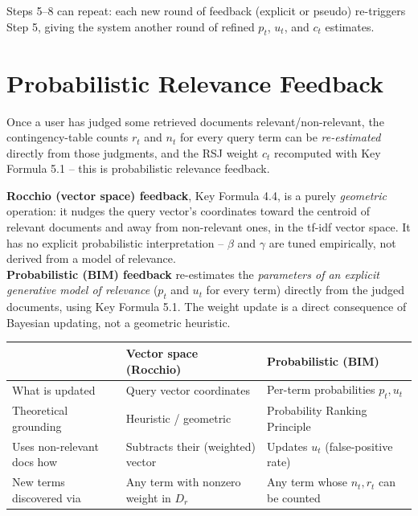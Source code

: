 \documentclass[11pt, a4paper]{article}
\begin{document}
Steps 5--8 can repeat: each new round of feedback (explicit or pseudo) re-triggers Step 5, giving the system another round of refined $p_t$, $u_t$, and $c_t$ estimates.

\section{Probabilistic Relevance Feedback}
\label{sec:vsm-vs-prob}

Once a user has judged some retrieved documents relevant/non-relevant, the contingency-table counts $r_t$ and $n_t$ for every query term can be \emph{re-estimated} directly from those judgments, and the RSJ weight $c_t$ recomputed with Key Formula 5.1 -- this is probabilistic relevance feedback.

\begin{defbox}
\textbf{Rocchio (vector space) feedback}, Key Formula 4.4, is a purely \emph{geometric} operation: it nudges the query vector's coordinates toward the centroid of relevant documents and away from non-relevant ones, in the tf-idf vector space. It has no explicit probabilistic interpretation -- $\beta$ and $\gamma$ are tuned empirically, not derived from a model of relevance.\\[4pt]
\textbf{Probabilistic (BIM) feedback} re-estimates the \emph{parameters of an explicit generative model of relevance} ($p_t$ and $u_t$ for every term) directly from the judged documents, using Key Formula 5.1. The weight update is a direct consequence of Bayesian updating, not a geometric heuristic.
\end{defbox}

\begin{center}
\begin{tabular}{@{}p{3.4cm}p{5.6cm}p{5.6cm}@{}}
\toprule
 & \textbf{Vector space (Rocchio)} & \textbf{Probabilistic (BIM)} \\
\midrule
What is updated & Query vector coordinates & Per-term probabilities $p_t,u_t$ \\
Theoretical grounding & Heuristic / geometric & Probability Ranking Principle \\
Uses non-relevant docs how & Subtracts their (weighted) vector & Updates $u_t$ (false-positive rate) \\
New terms discovered via & Any term with nonzero weight in $D_r$ & Any term whose $n_t,r_t$ can be counted \\
\bottomrule
\end{tabular}
\end{center}
\end{document}
